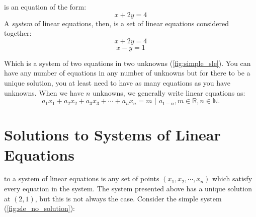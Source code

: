 \documentclass{tufte-book}
\begin{document}
 is an equation of the form:
\begin{equation*}
	x+2y=4
\end{equation*}
A \emph{system} of linear equations, then, is a set of linear equations considered together:
\begin{equation*}
	x+2y=4
\end{equation*}
\begin{equation*}
	x-y=1
\end{equation*}
\begin{marginfigure}[-0cm]
	\caption{$x+2y=4$, $x-y=1$ and their solution, $(2,1)$.}
	\label{fig:simple_sle}
\end{marginfigure}
Which is a system of two equations in two unknowns (\cref{fig:simple_sle}). You can have any number of equations in any number of unknowns
but for there to be a unique solution, you at least need to have as many equations as you have unknowns. When we have
$n$ unknowns, we generally write linear equations as:
\begin{equation*}
	a_1x_1+a_2x_2+a_3x_3+\cdots+a_nx_n=m \text{ | } a_{1-n},m \in \mathbb{R}, n \in \mathbb{N}.
\end{equation*}

\section{Solutions to Systems of Linear Equations}

 to a system of linear equations is any set of points $(x_1,x_2,\cdots,x_n)$ which satisfy every
equation in the system. The system presented above has a unique solution at $(2,1)$, but this is not always the case.
Consider the simple system (\cref{fig:sle_no_solution}):

\begin{marginfigure}[-2cm]
	\caption{The lines $y-x=0$ and $y-x=2$ are parallel and thus have no solution.}
	\label{fig:sle_no_solution}
\end{marginfigure}
\end{document}
